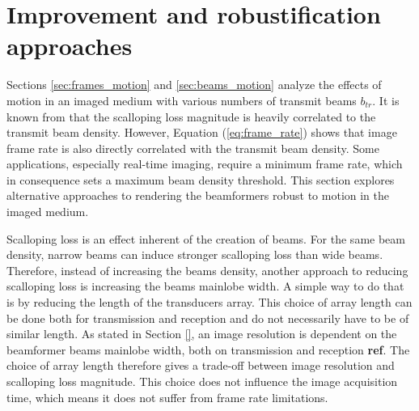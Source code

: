 \iffalse
\section{Improvement and robustification approaches}
\label{sec:improvement}
Sections \ref{sec:frames_motion} and \ref{sec:beams_motion} analyze the effects of motion in an imaged medium with various numbers of transmit  beams $b_{tr}$. It is known from \cite{Asen_shift_invariance} that the scalloping loss magnitude is heavily correlated to the transmit beam density. However, Equation (\ref{eq:frame_rate}) shows that image frame rate is also directly correlated with the transmit beam density. Some applications, especially real-time imaging, require a minimum frame rate, which in consequence sets a maximum beam density threshold. This section explores alternative approaches to rendering the beamformers robust to motion in the imaged medium.

Scalloping loss is an effect inherent of the creation of beams. For the same beam density, narrow beams can induce stronger scalloping loss than wide beams. Therefore, instead of increasing the beams density, another approach to reducing scalloping loss is increasing the beams mainlobe width. A simple way to do that is by reducing the length of the transducers array. This choice of array length can be done both for transmission and reception and do not necessarily have to be of similar length.
As stated in Section \ref{}, an image resolution is dependent on the beamformer beams mainlobe width, both on transmission and reception \textbf{ref}. The choice of array length therefore gives a trade-off between image resolution and scalloping loss magnitude. This choice does not influence the image acquisition time, which means it does not suffer from frame rate limitations.

